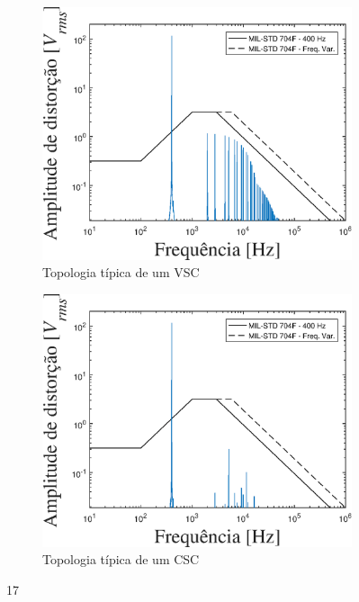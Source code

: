 \begin{figure}[!htb] %
	\centering
	\begin{subfigure}[b]{0.48\textwidth}
		\centering
		\includegraphics[width=\textwidth]{Cap4/Figuras/resultados_unfilt_17.eps}
		\caption{Topologia típica de um VSC} 
		\label{fig:resultados_unfilt_17.eps}
	\end{subfigure}%
		\hfill
	\begin{subfigure}[b]{0.48\textwidth}  
		\centering 
		\includegraphics[width=\textwidth]{Cap4/Figuras/resultados_filt_17.eps}
		\caption{Topologia típica de um CSC}    
		\label{fig:resultados_filt_17.eps}
	\end{subfigure}%
	\caption{17}
	\label{fig:17}
\end{figure}

